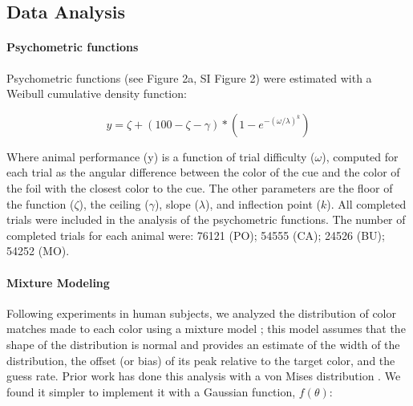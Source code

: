 \subsection{Data Analysis}

\paragraph{Psychometric functions}

Psychometric functions (see Figure 2a, SI Figure 2) were estimated with a Weibull cumulative density function: %

\begin{equation} \label{eq:Weibull}
    y=\zeta+(100-\zeta-\gamma) *\left(1-e^{-(\omega / \lambda)^k}\right) 
\end{equation}

Where animal performance (y) is a function of trial difficulty ($\omega$), computed for each trial as the angular difference between the color of the cue and the color of the foil with the closest color to the cue. 
The other parameters are the floor of the function ($\zeta$), the ceiling ($\gamma$), slope ($\lambda$), and inflection point ($k$). 
All completed trials were included in the analysis of the psychometric functions. 
The number of completed trials for each animal were: 76121 (PO); 54555 (CA); 24526 (BU); 54252 (MO). 

\paragraph{Mixture Modeling}\label{para:MixtureModeling}

Following experiments in human subjects, we analyzed the distribution of color matches made to each color using a mixture model \citep{zhang_discrete_2008,bae_why_2015}; this model assumes that the shape of the distribution is normal and provides an estimate of the width of the distribution, the offset (or bias) of its peak relative to the target color, and the guess rate.
Prior work has done this analysis with a von Mises distribution \citep{zhang_discrete_2008,bae_why_2015}.
We found it simpler to implement it with a Gaussian function, $f(\theta)$:



